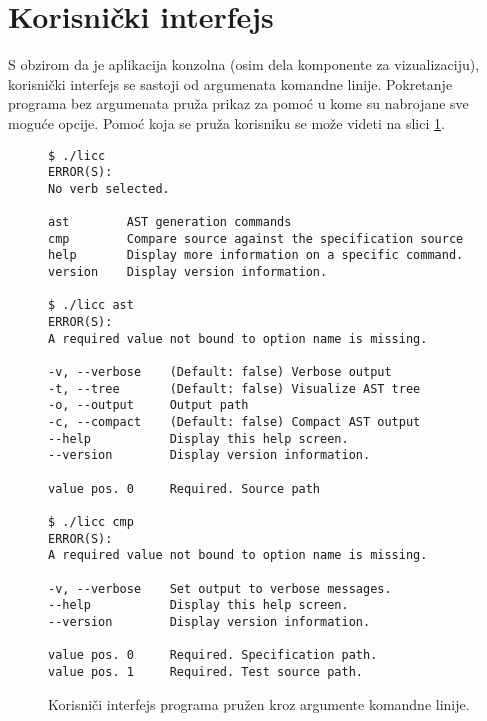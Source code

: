 \section{Korisnički interfejs}
\label{sec:ImplementationUI}

S obzirom da je aplikacija konzolna (osim dela komponente za vizualizaciju), korisnički interfejs se sastoji od argumenata komandne linije. Pokretanje programa bez argumenata pruža prikaz za pomoć u kome su nabrojane sve moguće opcije. Pomoć koja se pruža korisniku se može videti na slici \ref{fig:UIImpl}.

\begin{figure}[h!]
\centering
\begin{lstlisting}[language={}]
$ ./licc
ERROR(S):
No verb selected.

ast        AST generation commands
cmp        Compare source against the specification source
help       Display more information on a specific command.
version    Display version information.

$ ./licc ast
ERROR(S):
A required value not bound to option name is missing.

-v, --verbose    (Default: false) Verbose output
-t, --tree       (Default: false) Visualize AST tree
-o, --output     Output path
-c, --compact    (Default: false) Compact AST output
--help           Display this help screen.
--version        Display version information.

value pos. 0     Required. Source path

$ ./licc cmp
ERROR(S):
A required value not bound to option name is missing.

-v, --verbose    Set output to verbose messages.
--help           Display this help screen.
--version        Display version information.

value pos. 0     Required. Specification path.
value pos. 1     Required. Test source path.
\end{lstlisting}
\caption{Korisniči interfejs programa pružen kroz argumente komandne linije.}
\label{fig:UIImpl}
\end{figure}

